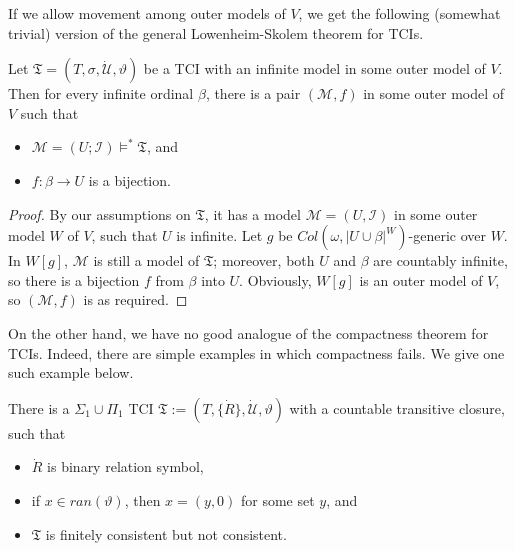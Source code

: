 \documentclass[12pt]{article}
\numberwithin{equation}{section}
\begin{document}
If we allow movement among outer models of $V$, we get the following (somewhat trivial) version of the general Lowenheim-Skolem theorem for TCIs.

\begin{lem}\label{GLS}
Let $\mathfrak{T} = (T, \sigma, \dot{\mathcal{U}}, \vartheta)$ be a TCI with an infinite model in some outer model of $V$. Then for every infinite ordinal $\beta$, there is a pair $(\mathcal{M}, f)$ in some outer model of $V$ such that 
\begin{itemize}
    \item $\mathcal{M} = (U; \mathcal{I}) \models^* \mathfrak{T}$, and
    \item $f : \beta \longrightarrow U$ is a bijection.
\end{itemize}
\end{lem}

\begin{proof}
By our assumptions on $\mathfrak{T}$, it has a model $\mathcal{M} = (U, \mathcal{I})$ in some outer model $W$ of $V$, such that $U$ is infinite. Let $g$ be $Col(\omega, |U \cup \beta|^W)$-generic over $W$. In $W[g]$, $\mathcal{M}$ is still a model of $\mathfrak{T}$; moreover, both $U$ and $\beta$ are countably infinite, so there is a bijection $f$ from $\beta$ into $U$. Obviously, $W[g]$ is an outer model of $V$, so $(\mathcal{M}, f)$ is as required.
\end{proof}

On the other hand, we have no good analogue of the compactness theorem for TCIs. Indeed, there are simple examples in which compactness fails. We give one such example below.

\begin{lem}\label{countercom}
There is a $\Sigma_1 \cup \Pi_1$ TCI $\mathfrak{T} := (T, \{\dot{R}\}, \dot{\mathcal{U}}, \vartheta)$ with a countable transitive closure, such that
\begin{itemize}
    \item $\dot{R}$ is binary relation symbol, 
    \item if $x \in ran(\vartheta)$, then $x = (y, 0)$ for some set $y$, and
    \item $\mathfrak{T}$ is finitely consistent but not consistent.
\end{itemize}
\end{lem}
\end{document}
